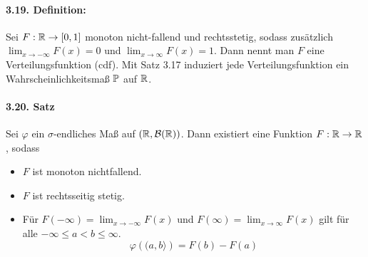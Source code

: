 \documentclass[12pt]{report}
\begin{document}
\paragraph{3.19. Definition:}Sei $F:\mathbb{R}\to[0,1]$ monoton nicht-fallend und rechtsstetig, sodass zus\"atzlich $\lim_{x\to-\infty}F(x)=0$ und $\lim_{x\to\infty}F(x)=1$. Dann nennt man $F$ eine Verteilungsfunktion (cdf). Mit Satz 3.17 induziert jede Verteilungsfunktion ein Wahrscheinlichkeitsma\ss{} $\mathbb{P}$ auf $\mathbb{R}$.

\paragraph{3.20. Satz} Sei $\varphi$ ein $\sigma$-endliches Ma\ss{} auf $(\mathbb{R},\mathcal{B}(\mathbb{R}))$. Dann existiert eine Funktion $F:\mathbb{R}\to\mathbb{R}$, sodass
\begin{itemize}
    \item $F$ ist monoton nichtfallend.
    \item $F$ ist rechtsseitig stetig.
    \item F\"ur $\displaystyle F(-\infty)=\lim_{x\to-\infty}F(x)$ und $F(\infty)=\displaystyle\lim_{x\to\infty}F(x)$ gilt f\"ur alle $-\infty\leq a<b\leq\infty$.
    $$\varphi\left((a,b\rangle\right)=F(b)-F(a)$$
\end{itemize}
\end{document}

